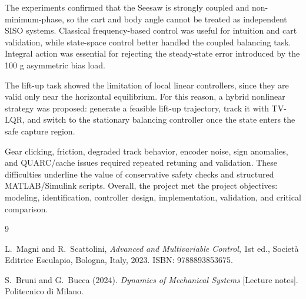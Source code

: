 \documentclass[11pt,a4paper]{article}
\begin{document}
The experiments confirmed that the Seesaw is strongly coupled and non-minimum-phase, so the cart and body angle cannot be treated as independent SISO systems. Classical frequency-based control was useful for intuition and cart validation, while state-space control better handled the coupled balancing task. Integral action was essential for rejecting the steady-state error introduced by the 100 g asymmetric bias load.

The lift-up task showed the limitation of local linear controllers, since they are valid only near the horizontal equilibrium. For this reason, a hybrid nonlinear strategy was proposed: generate a feasible lift-up trajectory, track it with TV-LQR, and switch to the stationary balancing controller once the state enters the safe capture region.

Gear clicking, friction, degraded track behavior, encoder noise, sign anomalies, and QUARC/cache issues required repeated retuning and validation. These difficulties underline the value of conservative safety checks and structured MATLAB/Simulink scripts. Overall, the project met the project objectives: modeling, identification, controller design, implementation, validation, and critical comparison.

\newpage


\begin{thebibliography}{9}

L.~Magni and R.~Scattolini,
\textit{Advanced and Multivariable Control},
1st ed.,
Società Editrice Esculapio, Bologna, Italy, 2023.
ISBN: 9788893853675.

S.~Bruni and G.~Bucca (2024). \textit{Dynamics of Mechanical Systems} [Lecture notes]. Politecnico di Milano.


\end{thebibliography}
\end{document}
